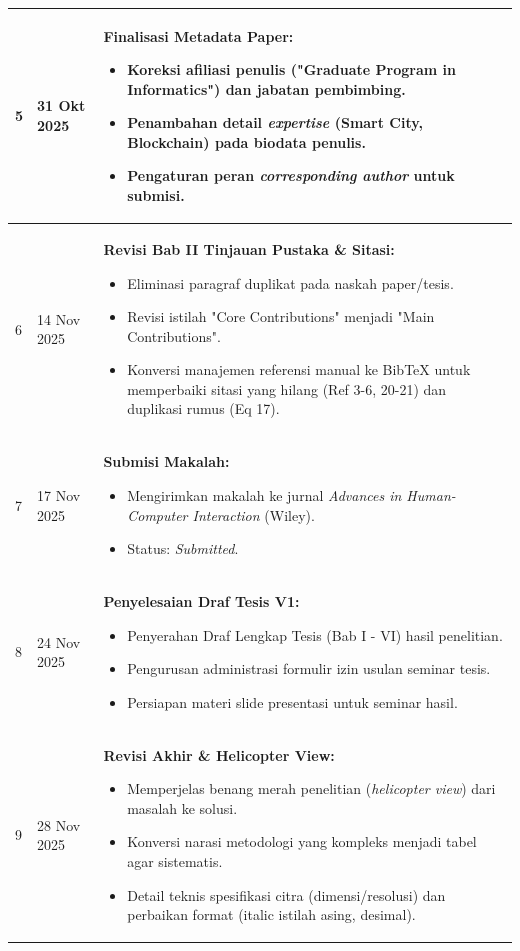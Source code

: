 \documentclass[a4paper,11pt]{article}
\begin{document}
\begin{longtable}{|C{1cm}|C{3cm}|L{10.5cm}|}
5 & 31 Okt 2025 & \textbf{Finalisasi Metadata Paper:}
\begin{itemize}[leftmargin=*, noitemsep]
    \item Koreksi afiliasi penulis ("Graduate Program in Informatics") dan jabatan pembimbing.
    \item Penambahan detail \textit{expertise} (Smart City, Blockchain) pada biodata penulis.
    \item Pengaturan peran \textit{corresponding author} untuk submisi.
\end{itemize} \\
\hline

6 & 14 Nov 2025 & \textbf{Revisi Bab II Tinjauan Pustaka \& Sitasi:}
\begin{itemize}[leftmargin=*, noitemsep]
    \item Eliminasi paragraf duplikat pada naskah paper/tesis.
    \item Revisi istilah "Core Contributions" menjadi "Main Contributions".
    \item Konversi manajemen referensi manual ke BibTeX untuk memperbaiki sitasi yang hilang (Ref 3-6, 20-21) dan duplikasi rumus (Eq 17).
\end{itemize} \\
\hline

7 & 17 Nov 2025 & \textbf{Submisi Makalah:}
\begin{itemize}[leftmargin=*, noitemsep]
    \item Mengirimkan makalah ke jurnal \textit{Advances in Human-Computer Interaction} (Wiley).
    \item Status: \textit{Submitted}.
\end{itemize} \\
\hline

8 & 24 Nov 2025 & \textbf{Penyelesaian Draf Tesis V1:}
\begin{itemize}[leftmargin=*, noitemsep]
    \item Penyerahan Draf Lengkap Tesis (Bab I - VI) hasil penelitian.
    \item Pengurusan administrasi formulir izin usulan seminar tesis.
    \item Persiapan materi slide presentasi untuk seminar hasil.
\end{itemize} \\
\hline

9 & 28 Nov 2025 & \textbf{Revisi Akhir \& Helicopter View:}
\begin{itemize}[leftmargin=*, noitemsep]
    \item Memperjelas benang merah penelitian (\textit{helicopter view}) dari masalah ke solusi.
    \item Konversi narasi metodologi yang kompleks menjadi tabel agar sistematis.
    \item Detail teknis spesifikasi citra (dimensi/resolusi) dan perbaikan format (italic istilah asing, desimal).
\end{itemize} \\
\hline

\end{longtable}
\end{document}

